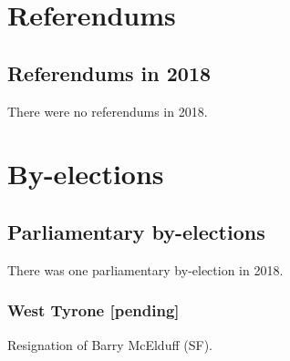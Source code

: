 \documentclass[a4paper,openany]{book}
\begin{document}
 
 



\part{Referendums}

\chapter{Referendums in 2018}

There were no referendums in 2018.

%
%

\part{By-elections}

\chapter{Parliamentary by-elections}

There was one parliamentary by-election in 2018.
%
%
%
\section*{West Tyrone \hspace*{\fill}\nolinebreak[1]%
\enspace\hspace*{\fill}
[pending]}


Resignation of Barry McElduff (SF).
\end{document}
